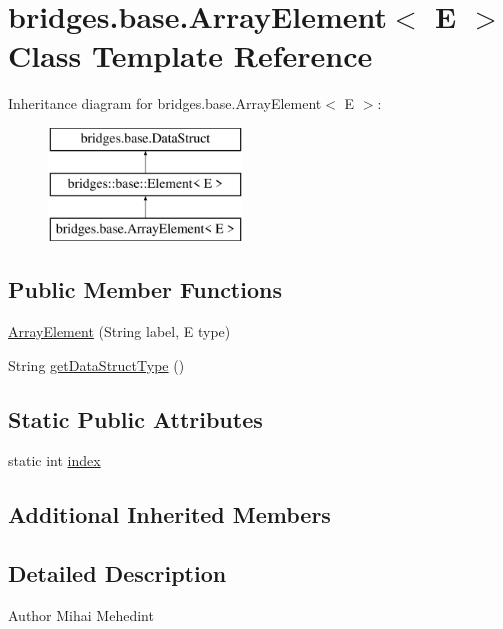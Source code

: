 \hypertarget{classbridges_1_1base_1_1_array_element}{}\section{bridges.\+base.\+Array\+Element$<$ E $>$ Class Template Reference}
\label{classbridges_1_1base_1_1_array_element}
Inheritance diagram for bridges.\+base.\+Array\+Element$<$ E $>$\+:\begin{figure}[H]
\begin{center}
\leavevmode
\includegraphics[height=3.000000cm]{classbridges_1_1base_1_1_array_element}
\end{center}
\end{figure}
\subsection*{Public Member Functions}
\begin{DoxyCompactItemize}
\item 
\mbox{\hyperlink{classbridges_1_1base_1_1_array_element_a90cbba952d50ff26fd2b89e9f3f81322}{Array\+Element}} (String label, E type)
\item 
String \mbox{\hyperlink{classbridges_1_1base_1_1_array_element_a1d4f3fae7bd986237e364c2cce0bea77}{get\+Data\+Struct\+Type}} ()
\end{DoxyCompactItemize}
\subsection*{Static Public Attributes}
\begin{DoxyCompactItemize}
\item 
static int \mbox{\hyperlink{classbridges_1_1base_1_1_array_element_a79c69e5046da8c297026d1e457a23182}{index}}
\end{DoxyCompactItemize}
\subsection*{Additional Inherited Members}


\subsection{Detailed Description}
\begin{DoxyAuthor}{Author}
Mihai Mehedint 
\end{DoxyAuthor}

